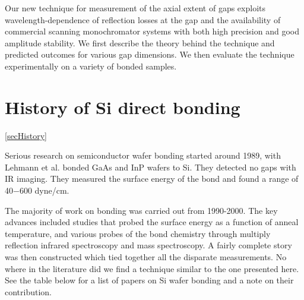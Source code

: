\documentclass[osajnl,preprint,showpacs,superscriptaddress,12pt]{revtex4-1} %
\begin{document}
Our new technique for measurement of the axial extent of gaps exploits wavelength-dependence of reflection losses at the gap and the availability of commercial scanning monochromator systems with both high precision and good amplitude stability.  We first describe the theory behind the technique and predicted outcomes for various gap dimensions.  We then evaluate the technique experimentally on a variety of bonded samples.  


\section{History of Si direct bonding}
\ref{secHistory}

Serious research on semiconductor wafer bonding started around 1989, with Lehmann et al. \cite{1989JaJAP..28L2141L} bonded GaAs and InP wafers to Si.  They detected no gaps with IR imaging.  They measured the surface energy of the bond and found a range of 40$-$600 dyne/cm.  


The majority of work on bonding was carried out from 1990-2000.  The key advances included studies that probed the surface energy as a function of anneal temperature, and various probes of the bond chemistry through multiply reflection infrared spectroscopy and mass spectroscopy.  A fairly complete story was then constructed which tied together all the disparate measurements.  No where in the literature did we find a technique similar to the one presented here.  See the table below for a list of papers on Si wafer bonding and a note on their contribution.
\end{document}
